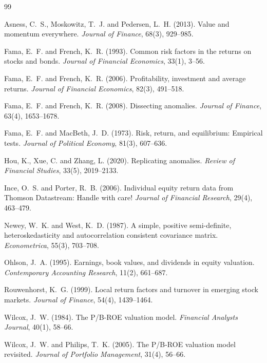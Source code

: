 \documentclass[11pt]{article}
\begin{document}

\begin{thebibliography}{99}
\setlength{\itemsep}{2pt}

Asness, C.~S., Moskowitz, T.~J. and Pedersen, L.~H. (2013). Value and momentum everywhere.
\textit{Journal of Finance}, 68(3), 929--985.

Fama, E.~F. and French, K.~R. (1993). Common risk factors in the returns on stocks and bonds.
\textit{Journal of Financial Economics}, 33(1), 3--56.

Fama, E.~F. and French, K.~R. (2006). Profitability, investment and average returns.
\textit{Journal of Financial Economics}, 82(3), 491--518.

Fama, E.~F. and French, K.~R. (2008). Dissecting anomalies. \textit{Journal of Finance}, 63(4),
1653--1678.

Fama, E.~F. and MacBeth, J.~D. (1973). Risk, return, and equilibrium: Empirical tests.
\textit{Journal of Political Economy}, 81(3), 607--636.

Hou, K., Xue, C. and Zhang, L. (2020). Replicating anomalies. \textit{Review of Financial Studies},
33(5), 2019--2133.

Ince, O.~S. and Porter, R.~B. (2006). Individual equity return data from Thomson Datastream: Handle
with care! \textit{Journal of Financial Research}, 29(4), 463--479.

Newey, W.~K. and West, K.~D. (1987). A simple, positive semi\mbox{-}definite, heteroskedasticity and
autocorrelation consistent covariance matrix. \textit{Econometrica}, 55(3), 703--708.

Ohlson, J.~A. (1995). Earnings, book values, and dividends in equity valuation.
\textit{Contemporary Accounting Research}, 11(2), 661--687.

Rouwenhorst, K.~G. (1999). Local return factors and turnover in emerging stock markets.
\textit{Journal of Finance}, 54(4), 1439--1464.

Wilcox, J.~W. (1984). The P/B\mbox{-}ROE valuation model. \textit{Financial Analysts Journal},
40(1), 58--66.

Wilcox, J.~W. and Philips, T.~K. (2005). The P/B\mbox{-}ROE valuation model revisited.
\textit{Journal of Portfolio Management}, 31(4), 56--66.

\end{thebibliography}
\end{document}
